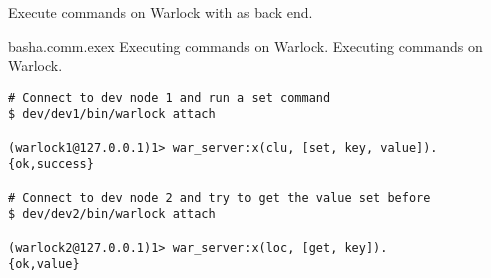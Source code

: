 Execute commands on Warlock with  as back end.

\begin{scode}{bash}{a.comm.exex}{%
  Executing commands on Warlock.}{%
  Executing commands on Warlock.}
  \begin{lstlisting}
# Connect to dev node 1 and run a set command  
$ dev/dev1/bin/warlock attach

(warlock1@127.0.0.1)1> war_server:x(clu, [set, key, value]).
{ok,success}

# Connect to dev node 2 and try to get the value set before
$ dev/dev2/bin/warlock attach

(warlock2@127.0.0.1)1> war_server:x(loc, [get, key]).
{ok,value}
  \end{lstlisting}
\end{scode}

